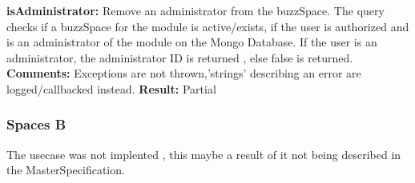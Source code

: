 \textbf{isAdministrator:} Remove an administrator from the buzzSpace. \newline
The query checks if a buzzSpace for the module is active/exists, if the user is authorized and is an administrator of the module on the Mongo Database.\newline
If the user is an administrator, the administrator ID is returned , else false is returned. \newline
\textbf{Comments:} Exceptions are not thrown,'strings' describing an error are logged/callbacked instead. \newline
\textbf{Result:}  Partial \newline

\subsubsection{Spaces B}
The usecase was not implented , this maybe a result of it not being described in the MasterSpecification.
